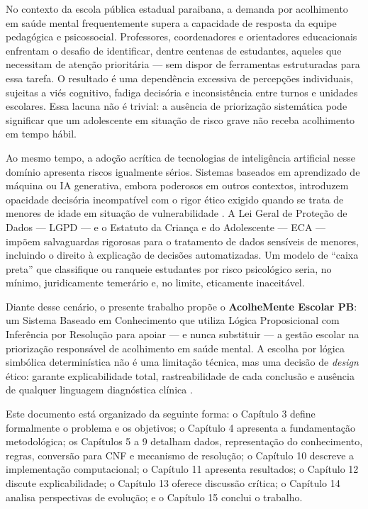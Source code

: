 \documentclass[
    12pt,
    openright,
    oneside,
    a4paper,
    english,
    brazil
]{abntex2}
\begin{document}
No contexto da escola pública estadual paraibana, a demanda por acolhimento em saúde mental frequentemente supera a capacidade de resposta da equipe pedagógica e psicossocial. Professores, coordenadores e orientadores educacionais enfrentam o desafio de identificar, dentre centenas de estudantes, aqueles que necessitam de atenção prioritária --- sem dispor de ferramentas estruturadas para essa tarefa. O resultado é uma dependência excessiva de percepções individuais, sujeitas a viés cognitivo, fadiga decisória e inconsistência entre turnos e unidades escolares. Essa lacuna não é trivial: a ausência de priorização sistemática pode significar que um adolescente em situação de risco grave não receba acolhimento em tempo hábil.

Ao mesmo tempo, a adoção acrítica de tecnologias de inteligência artificial nesse domínio apresenta riscos igualmente sérios. Sistemas baseados em aprendizado de máquina ou IA generativa, embora poderosos em outros contextos, introduzem opacidade decisória incompatível com o rigor ético exigido quando se trata de menores de idade em situação de vulnerabilidade \cite{jobin_ai_ethics_2019}. A Lei Geral de Proteção de Dados --- LGPD \cite{brasil_lgpd_2018} --- e o Estatuto da Criança e do Adolescente --- ECA \cite{brasil_eca_1990} --- impõem salvaguardas rigorosas para o tratamento de dados sensíveis de menores, incluindo o direito à explicação de decisões automatizadas. Um modelo de ``caixa preta'' que classifique ou ranqueie estudantes por risco psicológico seria, no mínimo, juridicamente temerário e, no limite, eticamente inaceitável.

Diante desse cenário, o presente trabalho propõe o \textbf{AcolheMente Escolar PB}: um Sistema Baseado em Conhecimento que utiliza Lógica Proposicional com Inferência por Resolução para apoiar --- e nunca substituir --- a gestão escolar na priorização responsável de acolhimento em saúde mental. A escolha por lógica simbólica determinística não é uma limitação técnica, mas uma decisão de \textit{design} ético: garante explicabilidade total, rastreabilidade de cada conclusão e ausência de qualquer linguagem diagnóstica clínica \cite{russell_norvig_2022}.

Este documento está organizado da seguinte forma: o Capítulo 3 define formalmente o problema e os objetivos; o Capítulo 4 apresenta a fundamentação metodológica; os Capítulos 5 a 9 detalham dados, representação do conhecimento, regras, conversão para CNF e mecanismo de resolução; o Capítulo 10 descreve a implementação computacional; o Capítulo 11 apresenta resultados; o Capítulo 12 discute explicabilidade; o Capítulo 13 oferece discussão crítica; o Capítulo 14 analisa perspectivas de evolução; e o Capítulo 15 conclui o trabalho.
\end{document}
